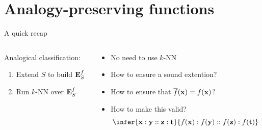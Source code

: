 \documentclass{beamer}
\begin{document}
\section[AP functions]{Analogy-preserving functions}
\begin{frame}{A quick recap}
  \begin{columns}
    \begin{column}{.4\textwidth}
      Analogical classification:
      \begin{enumerate}
        \item Extend $S$ to build $\mathbf{E}_{S}^{f}$
        \item Run $k$-NN over $\mathbf{E}_{S}^{f}$
      \end{enumerate}
    \end{column}
    \begin{column}{.6\textwidth}
      \begin{itemize}
        \item No need to use $k$-NN
        \item How to ensure a sound extention?
        \item How to ensure that $\overline{f}(\mathbf{x}) = f(\mathbf{x})$?
        \item \alert{How to make this valid?}
        $$
        \infer{\mathbf{x} : \mathbf{y} ::
        \mathbf{z} : \mathbf{t}}{f(\mathbf{x}) : f(\mathbf{y}) :: f(\mathbf{z}) :
        f(\mathbf{t})}
        $$
      \end{itemize}
    \end{column}
  \end{columns}
\end{frame}
\end{document}
